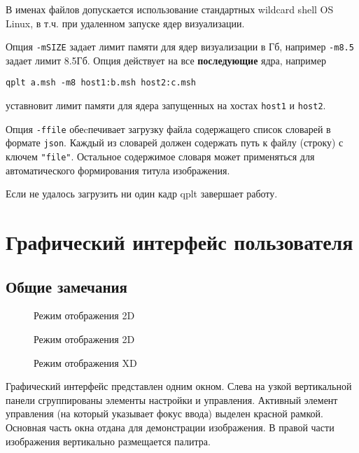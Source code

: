 \documentclass[12pt]{article}
\begin{document}
В именах файлов допускается использование стандартных wildcard shell OS Linux, в т.ч. при удаленном запуске ядер визуализации.

Опция \verb'-mSIZE' задает лимит памяти для ядер визуализации в Гб, например \verb'-m8.5' задает лимит 8.5Гб. Опция действует на все
{\bf последующие} ядра, например
\begin{verbatim}
qplt a.msh -m8 host1:b.msh host2:c.msh
\end{verbatim}
уставновит лимит памяти для ядера запущенных на хостах \verb'host1' и \verb'host2'.

Опция  \verb'-ffile' обеcпечивает загрузку файла содержащего список словарей в формате \verb'json'.
Каждый из словарей должен содержать путь к файлу (строку) с ключем \verb'"file"'.
Остальное содержимое словаря может применяться для автоматического формирования титула изображения.

Если не удалось загрузить ни один кадр qplt завершает работу.

\section{Графический интерфейс пользователя}
\subsection{Общие замечания}
\begin{figure}[hb]
  \begin{center}
  \end{center}
  \caption{Режим отображения 2D}\label{2D:pict}
\end{figure}

\begin{figure}
  \begin{center}
  \end{center}
  \caption{Режим отображения 2D}\label{3D:pict}
  \begin{center}
  \end{center}
  \caption{Режим отображения XD}\label{XD:pict}
\end{figure}
Графический интерфейс представлен одним окном. Слева на узкой вертикальной панели сгруппированы элементы настройки и управления.
Активный элемент управления (на который указывает фокус ввода) выделен красной рамкой.
Основная часть окна отдана для демонстрации изображения. В правой части изображения вертикально размещается палитра. 
\end{document}
